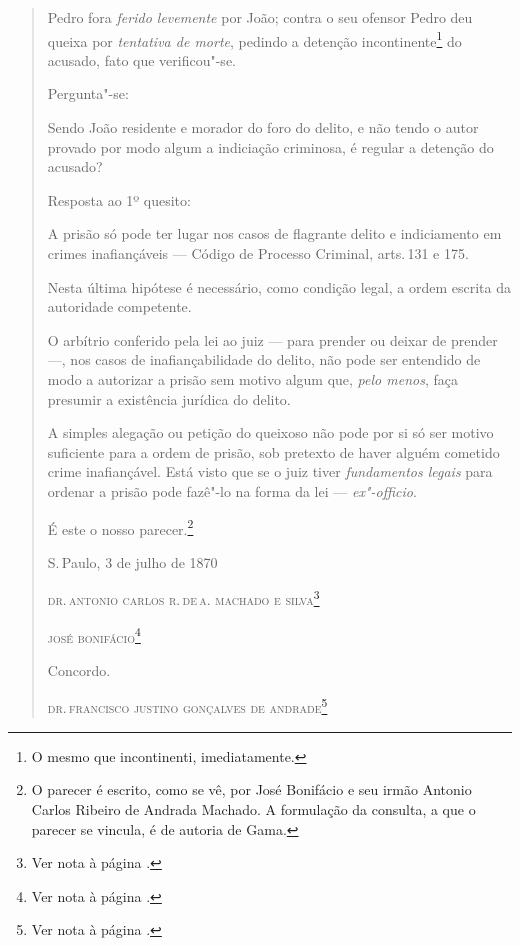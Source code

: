 \begin{quote}
Pedro fora \emph{ferido levemente} por João; contra o seu ofensor Pedro
deu queixa por \emph{tentativa de morte}, pedindo a detenção
incontinente\footnote{O mesmo que incontinenti, imediatamente.} do
acusado, fato que verificou"-se.

Pergunta"-se:

Sendo João residente e morador do foro do delito, e não tendo o autor
provado por modo algum a indiciação criminosa, é regular a detenção do
acusado?


Resposta ao 1º quesito:

A prisão só pode ter lugar nos casos de flagrante delito e indiciamento
em crimes inafiançáveis --- Código de Processo Criminal, arts.\,131 e
175.

Nesta última hipótese é necessário, como condição legal, a ordem escrita
da autoridade competente.

O arbítrio conferido pela lei ao juiz --- para prender ou deixar de
prender ---, nos casos de inafiançabilidade do delito, não pode ser
entendido de modo a autorizar a prisão sem motivo algum que, \emph{pelo
menos}, faça presumir a existência jurídica do delito.

A simples alegação ou petição do queixoso não pode por si só ser motivo
suficiente para a ordem de prisão, sob pretexto de haver alguém cometido
crime inafiançável. Está visto que se o juiz tiver \emph{fundamentos
legais} para ordenar a prisão pode fazê"-lo na forma da lei ---
\emph{ex"-officio}.


É este o nosso parecer.\footnote{O parecer é escrito, como se vê, por
  José Bonifácio e seu irmão Antonio Carlos Ribeiro de Andrada Machado.
  A formulação da consulta, a que o parecer se vincula, é de autoria de
  Gama.}

\noindent{}S.\,Paulo, 3 de julho de 1870\smallskip

\noindent\textsc{dr.\,antonio carlos r.\,de\,a. machado e silva}\footnote{Ver nota à página \pageref{machado}.}

\noindent\textsc{josé bonifácio}\footnote{Ver nota à página \pageref{bonifacio}.}\medskip

\noindent{}Concordo.

\noindent\textsc{dr.\,francisco justino gonçalves de andrade}\footnote{Ver nota à página \pageref{justino}.}\medskip


\end{quote}
